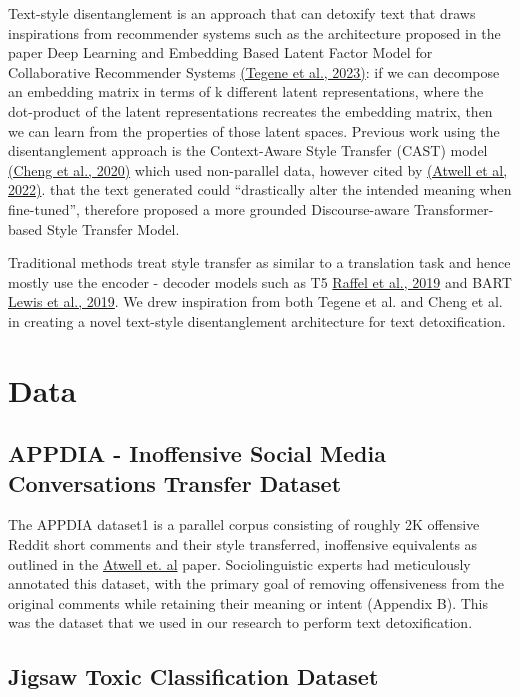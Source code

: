 \documentclass[11pt]{article}
\begin{document}
Text-style disentanglement is an approach that can detoxify text that draws inspirations from recommender systems such as the architecture proposed in the paper Deep Learning and Embedding Based Latent Factor Model for Collaborative Recommender Systems  \hyperref[sec:Tegene]{(Tegene et al., 2023)}: if we can decompose an embedding matrix in terms of k different latent representations, where the dot-product of the latent representations recreates the embedding matrix, then we can learn from the properties of those latent spaces. Previous work using the disentanglement approach is the Context-Aware Style Transfer (CAST) model \hyperref[sec:Cheng]{(Cheng et al., 2020)} which used non-parallel data, however cited by \hyperref[sec:Atwell]{(Atwell et al, 2022)}.  that the text generated could “drastically alter the intended meaning when fine-tuned”, therefore proposed a more grounded Discourse-aware Transformer-based Style Transfer Model.

Traditional methods treat style transfer as similar to a translation task and hence mostly use the encoder - decoder models such as T5 \hyperref[sec:Raffel]{Raffel et al., 2019} and BART \hyperref[sec:Lewis]{Lewis et al., 2019}.  We drew inspiration from both Tegene et al. and Cheng et al. in creating a novel text-style disentanglement architecture for text detoxification.

\section{Data}

\subsection{APPDIA - Inoffensive Social Media Conversations Transfer Dataset}

The APPDIA dataset1 is a parallel corpus consisting of roughly 2K offensive Reddit short comments and their style transferred, inoffensive equivalents as outlined in the \hyperref[sec:Atwell]{Atwell et. al}  paper. Sociolinguistic experts had meticulously annotated this dataset, with the primary goal of removing offensiveness from the original comments while retaining their meaning or intent (Appendix B).
This was the dataset that we used in our research to perform text detoxification.

\subsection{Jigsaw Toxic Classification Dataset}
\end{document}
